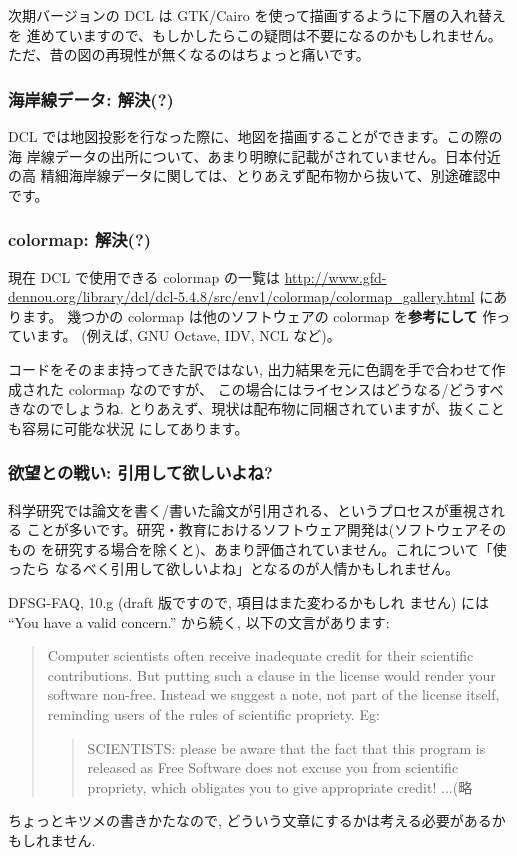 \documentclass[mingoth,a4paper,twoside]{jsarticle}
\begin{document}
次期バージョンの DCL は GTK/Cairo を使って描画するように下層の入れ替えを
進めていますので、もしかしたらこの疑問は不要になるのかもしれません。%
ただ、昔の図の再現性が無くなるのはちょっと痛いです。

\subsubsection{%
  海岸線データ: 解決(?)
}

DCL では地図投影を行なった際に、地図を描画することができます。この際の海
岸線データの出所について、あまり明瞭に記載がされていません。日本付近の高
精細海岸線データに関しては、とりあえず配布物から抜いて、別途確認中です。

\subsubsection{%
  colormap: 解決(?)
}

現在 DCL で使用できる colormap の一覧は
\url{http://www.gfd-dennou.org/library/dcl/dcl-5.4.8/src/env1/colormap/colormap_gallery.html}
にあります。
%
幾つかの colormap は他のソフトウェアの colormap を\textbf{参考にして} 作っています。
(例えば, GNU Octave\cite{Octave}, IDV\cite{IDV}, NCL\cite{NCL} など)。
%

コードをそのまま持ってきた訳ではない,
出力結果を元に色調を手で合わせて作成された colormap なのですが、
この場合にはライセンスはどうなる/どうすべきなのでしょうね.
%
とりあえず、現状は配布物に同梱されていますが、抜くことも容易に可能な状況
にしてあります。

\subsubsection{%
  欲望との戦い: 引用して欲しいよね?
}

科学研究では論文を書く/書いた論文が引用される、というプロセスが重視される
ことが多いです。研究・教育におけるソフトウェア開発は(ソフトウェアそのもの
を研究する場合を除くと)、あまり評価されていません。これについて「使ったら
なるべく引用して欲しいよね」となるのが人情かもしれません。

DFSG-FAQ\cite{DFSG FAQ}, 10.g (draft 版ですので, 項目はまた変わるかもしれ
ません) には ``You have a valid concern.'' から続く, 以下の文言があります:
\vspace{-.5em}
\begin{quotation}
  \noindent
  Computer scientists often receive inadequate credit for their
  scientific contributions. But putting such a clause in the license
  would render your software non-free. Instead we suggest a note, not
  part of the license itself, reminding users of the rules of scientific
  propriety. Eg:
  \begin{quotation}
    \noindent
    SCIENTISTS: please be aware that the fact that this program is
    released as Free Software does not excuse you from scientific
    propriety, which obligates you to give appropriate credit!
    ...(略
  \end{quotation}
\end{quotation}
\vspace{-.5em}
ちょっとキツメの書きかたなので, どういう文章にするかは考える必要があるか
もしれません.
\end{document}
